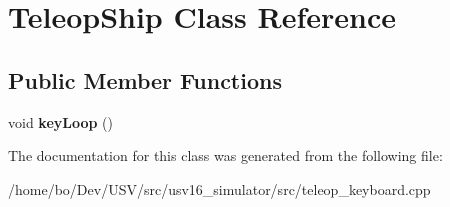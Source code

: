 \hypertarget{class_teleop_ship}{\section{Teleop\-Ship Class Reference}
\label{class_teleop_ship}
}
\subsection*{Public Member Functions}
\begin{DoxyCompactItemize}
\item 
\hypertarget{class_teleop_ship_ab84caa3ebbb28eef9d72628d6b122af8}{void {\bfseries key\-Loop} ()}\label{class_teleop_ship_ab84caa3ebbb28eef9d72628d6b122af8}

\end{DoxyCompactItemize}


The documentation for this class was generated from the following file\-:\begin{DoxyCompactItemize}
\item 
/home/bo/\-Dev/\-U\-S\-V/src/usv16\-\_\-simulator/src/teleop\-\_\-keyboard.\-cpp\end{DoxyCompactItemize}
